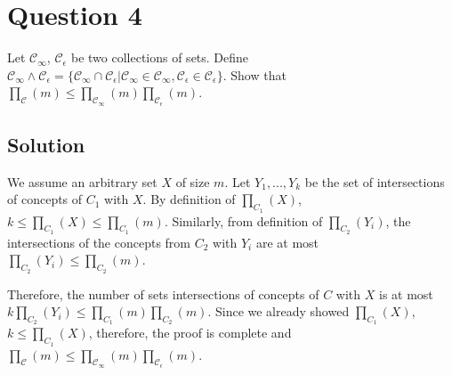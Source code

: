 \section*{Question 4}

Let $\mathcal{C}_\infty$, $\mathcal{C}_\epsilon$ be two collections of sets. Define  $\mathcal{C}_\infty \wedge \mathcal{C}_\epsilon = \{ \mathcal{C}_\infty \cap \mathcal{C}_\epsilon | \mathcal{C}_\infty \in \mathcal{C}_\infty, \mathcal{C}_\epsilon \in \mathcal{C}_\epsilon \}$. Show that $\prod_\mathcal{C}(m) \leq \prod_{\mathcal{C}_\infty}(m) \prod_{\mathcal{C}_\epsilon}(m)$.

\subsection*{Solution}

We assume an arbitrary set $X$ of size $m$. Let $Y_1, ..., Y_k$ be the set of intersections of concepts of $C_1$ with $X$.
By definition of $\prod_{C_1}(X)$,
$k \leq \prod_{C_1}(X) \leq \prod_{C_1}(m)$.
Similarly, from definition of $\prod_{C_2}(Y_i)$, the intersections of the concepts from $C_2$ with $Y_i$ are at most $\prod_{C_2}(Y_i) \leq \prod_{C_2}(m)$.

Therefore, the number of sets intersections of concepts of $C$ with $X$ is at most
$k \prod_{C_2} (Y_i) \leq \prod_{C_1}(m) \prod_{C_2}(m)$.
Since we already showed $\prod_{C_1}(X)$,
$k \leq \prod_{C_1}(X)$, therefore, the proof is complete and $\prod_\mathcal{C}(m) \leq \prod_{\mathcal{C}_\infty}(m) \prod_{\mathcal{C}_\epsilon}(m)$.
